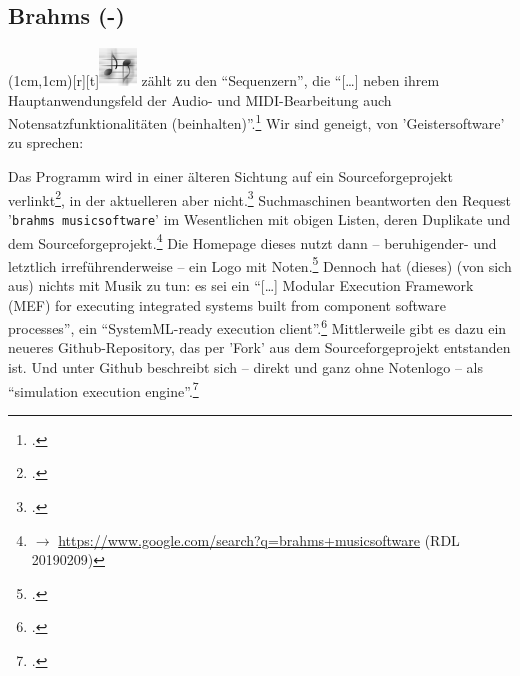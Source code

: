 %
%
%



\subsection{Brahms (-)}

\parpic(1cm,1cm)[r][t]{\includegraphics[width=1cm]{logos/brahms-300dpi.png}}
\label{Brahms} zählt  zu den \enquote{Sequenzern},
die \enquote{[\ldots] neben ihrem Hauptanwendungsfeld der Audio- und
MIDI-Bearbeitung auch Notensatzfunktionalitäten
(beinhalten)}.\footcite[vgl.][\nopage wp.]{WpedNotensatz2019a} Wir sind geneigt,
von 'Geistersoftware' zu sprechen:

Das Programm  wird in einer älteren Sichtung auf ein
Sourceforgeprojekt verlinkt\footcite[vgl.][\nopage wp.]{Callon2009a}, in der
aktuelleren aber nicht.\footcite[vgl.][\nopage wp.]{WpedNotensatz2019a}
Suchmaschinen beantworten den Request '\texttt{brahms musicsoftware}' im
Wesentlichen mit obigen Listen, deren Duplikate und dem
Sourceforgeprojekt.\footnote{$\rightarrow$
\href{https://www.google.com/search?q=brahms+musicsoftware}
{https://www.google.com/search?q=brahms+musicsoftware} (RDL 20190209)} Die
Homepage dieses  nutzt dann -- beruhigender-
und letztlich irreführenderweise -- ein Logo mit Noten.\footcite[vgl.][\nopage
wp.]{Brahms2013a} Dennoch hat (dieses)  (von sich aus) nichts mit
Musik zu tun: es sei ein \enquote{[\ldots] Modular Execution Framework (MEF) for
executing integrated systems built from component software processes}, ein
\enquote{SystemML-ready execution client}.\footcite[vgl.][\nopage
wp.]{Brahms2013b} Mittlerweile gibt es dazu ein neueres Github-Repository, das
per 'Fork' aus dem Sourceforgeprojekt entstanden ist. Und unter Github
beschreibt sich  -- direkt und ganz ohne Notenlogo -- als
\enquote{simulation execution engine}.\footcite[vgl.][\nopage wp.]{Brahms2018a}


